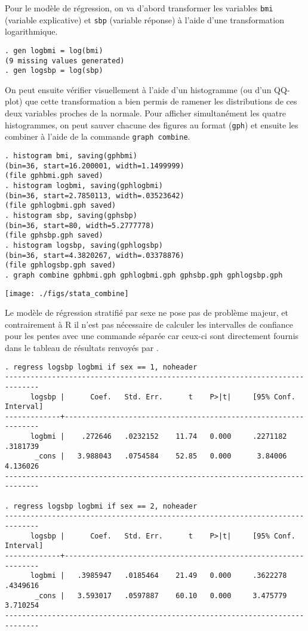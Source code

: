 Pour le modèle de régression, on va d'abord transformer les variables
\texttt{bmi} (variable explicative) et \texttt{sbp} (variable réponse) à
l'aide d'une transformation logarithmique.
\begin{verbatim}
. gen logbmi = log(bmi)
(9 missing values generated)
. gen logsbp = log(sbp)
\end{verbatim}
On peut ensuite vérifier visuellement à l'aide d'un histogramme (ou d'un
QQ-plot) que cette transformation a bien permis de ramener les distributions
de ces deux variables proches de la normale. Pour afficher simultanément les
quatre histogrammes, on peut sauver chacune des figures au format \Stata
(\texttt{gph}) et ensuite les combiner à l'aide de la commande \texttt{graph combine}.
\begin{verbatim}
. histogram bmi, saving(gphbmi)
(bin=36, start=16.200001, width=1.1499999)
(file gphbmi.gph saved)
. histogram logbmi, saving(gphlogbmi)
(bin=36, start=2.7850113, width=.03523642)
(file gphlogbmi.gph saved)
. histogram sbp, saving(gphsbp)
(bin=36, start=80, width=5.2777778)
(file gphsbp.gph saved)
. histogram logsbp, saving(gphlogsbp)
(bin=36, start=4.3820267, width=.03378876)
(file gphlogsbp.gph saved)
. graph combine gphbmi.gph gphlogbmi.gph gphsbp.gph gphlogsbp.gph
\end{verbatim}

\texttt{[image: ./figs/stata\_combine]}

Le modèle de régression stratifié par sexe ne pose pas de problème majeur,
et contrairement à R il n'est pas nécessaire de calculer les intervalles de
confiance pour les pentes avec une commande séparée car ceux-ci sont
directement fournis dans le tableau de résultats renvoyés par \Stata.
\begin{verbatim}
. regress logsbp logbmi if sex == 1, noheader
------------------------------------------------------------------------------
      logsbp |      Coef.   Std. Err.      t    P>|t|     [95% Conf. Interval]
-------------+----------------------------------------------------------------
      logbmi |    .272646   .0232152    11.74   0.000     .2271182    .3181739
       _cons |   3.988043   .0754584    52.85   0.000      3.84006    4.136026
------------------------------------------------------------------------------

. regress logsbp logbmi if sex == 2, noheader
------------------------------------------------------------------------------
      logsbp |      Coef.   Std. Err.      t    P>|t|     [95% Conf. Interval]
-------------+----------------------------------------------------------------
      logbmi |   .3985947   .0185464    21.49   0.000     .3622278    .4349616
       _cons |   3.593017   .0597887    60.10   0.000     3.475779    3.710254
------------------------------------------------------------------------------
\end{verbatim}

